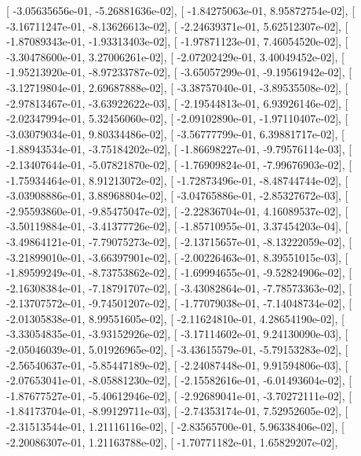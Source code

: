 \documentclass{article}
\begin{document}
       [ -3.05635656e-01,  -5.26881636e-02],
       [ -1.84275063e-01,   8.95872754e-02],
       [ -3.16711247e-01,  -8.13626613e-02],
       [ -2.24639371e-01,   5.62512307e-02],
       [ -1.87089343e-01,  -1.93313403e-02],
       [ -1.97871123e-01,   7.46054520e-02],
       [ -3.30478600e-01,   3.27006261e-02],
       [ -2.07202429e-01,   3.40049452e-02],
       [ -1.95213920e-01,  -8.97233787e-02],
       [ -3.65057299e-01,  -9.19561942e-02],
       [ -3.12719804e-01,   2.69687888e-02],
       [ -3.38757040e-01,  -3.89535508e-02],
       [ -2.97813467e-01,  -3.63922622e-03],
       [ -2.19544813e-01,   6.93926146e-02],
       [ -2.02347994e-01,   5.32456060e-02],
       [ -2.09102890e-01,  -1.97110407e-02],
       [ -3.03079034e-01,   9.80334486e-02],
       [ -3.56777799e-01,   6.39881717e-02],
       [ -1.88943534e-01,  -3.75184202e-02],
       [ -1.86698227e-01,  -9.79576114e-03],
       [ -2.13407644e-01,  -5.07821870e-02],
       [ -1.76909824e-01,  -7.99676903e-02],
       [ -1.75934464e-01,   8.91213072e-02],
       [ -1.72873496e-01,  -8.48744744e-02],
       [ -3.03908886e-01,   3.88968804e-02],
       [ -3.04765886e-01,  -2.85327672e-03],
       [ -2.95593860e-01,  -9.85475047e-02],
       [ -2.22836704e-01,   4.16089537e-02],
       [ -3.50119884e-01,  -3.41377726e-02],
       [ -1.85710955e-01,   3.37454203e-04],
       [ -3.49864121e-01,  -7.79075273e-02],
       [ -2.13715657e-01,  -8.13222059e-02],
       [ -3.21899010e-01,  -3.66397901e-02],
       [ -2.00226463e-01,   8.39551015e-03],
       [ -1.89599249e-01,  -8.73753862e-02],
       [ -1.69994655e-01,  -9.52824906e-02],
       [ -2.16308384e-01,  -7.18791707e-02],
       [ -3.43082864e-01,  -7.78573363e-02],
       [ -2.13707572e-01,  -9.74501207e-02],
       [ -1.77079038e-01,  -7.14048734e-02],
       [ -2.01305838e-01,   8.99551605e-02],
       [ -2.11624810e-01,   4.28654190e-02],
       [ -3.33054835e-01,  -3.93152926e-02],
       [ -3.17114602e-01,   9.24130090e-03],
       [ -2.05046039e-01,   5.01926965e-02],
       [ -3.43615579e-01,  -5.79153283e-02],
       [ -2.56540637e-01,  -5.85447189e-02],
       [ -2.24087448e-01,   9.91594806e-03],
       [ -2.07653041e-01,  -8.05881230e-02],
       [ -2.15582616e-01,  -6.01493604e-02],
       [ -1.87677527e-01,  -5.40612946e-02],
       [ -2.92689041e-01,  -3.70272111e-02],
       [ -1.84173704e-01,  -8.99129711e-03],
       [ -2.74353174e-01,   7.52952605e-02],
       [ -2.31513544e-01,   1.21116116e-02],
       [ -2.83565700e-01,   5.96338406e-02],
       [ -2.20086307e-01,   1.21163788e-02],
       [ -1.70771182e-01,   1.65829207e-02],
\end{document}
